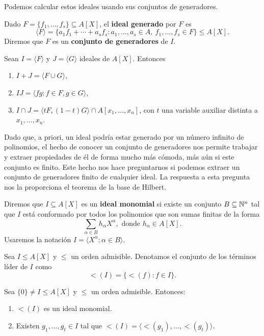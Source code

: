 Podemos calcular estos ideales usando sus conjuntos de generadores.
\begin{definicion}
    Dado $F=\{f_1,\dots, f_s\}\subseteq A[X]$, el \textbf{ideal generado} por $F$ es
    \begin{equation*}
        \langle F \rangle = \{a_1f_1 + \cdots + a_sf_s : a_1,\dots, a_s\in A,\ f_1,\dots, f_s\in F\}\le A[X].
    \end{equation*}
    Diremos que $F$ es un \textbf{conjunto de generadores} de $I$.
\end{definicion}

\begin{proposicion}
    Sean $I=\langle F\rangle$ y $J=\langle G\rangle$ ideales de $A[X]$. Entonces
    \begin{enumerate}
        \item $I+J = \langle F\cup G\rangle$,
        \item $IJ = \langle fg : f\in F, g\in G \rangle$,
        \item $I\cap J = \langle tF, (1-t)G \rangle \cap A[x_1,\dots, x_n]$, con $t$ una variable auxiliar distinta a $x_1,\dots, x_n$.
    \end{enumerate}
\end{proposicion}
Dado que, a priori, un ideal podría estar generado por un número infinito de polinomios, el hecho de conocer un conjunto de generadores nos permite trabajar y extraer propiedades de él de forma mucho más cómoda, más aún si este conjunto es finito. Este hecho nos hace preguntarnos si podemos extraer un conjunto de generadores finito de cualquier ideal. La respuesta a esta pregunta nos la proporciona el teorema de la base de Hilbert.
\begin{definicion}
    Diremos que $I\subseteq A[X]$ es un \textbf{ideal monomial} si existe un conjunto $B\subseteq \mathbb{N}^n$ tal que $I$ está conformado por todos los polinomios que son sumas finitas de la forma
    $$\sum_{\alpha \in B} h_{\alpha}X^{\alpha}, \text{ donde } h_{\alpha}\in A[X].$$
    Usaremos la notación $I = \langle X^{\alpha} : \alpha \in B \rangle$.
\end{definicion}
\begin{definicion}
    Sea $I\le A[X]$ y $\le$ un orden admisible. Denotamos el conjunto de los términos líder de $I$ como
    \begin{equation*}
        \lt(I) = \{\lt(f) : f\in I\}.
    \end{equation*}
\end{definicion}
\begin{lema}\label{l:lt}
    Sea $\{0\}\neq I\le A[X]$ y $\le$ un orden admisible. Entonces:
    \begin{enumerate}
        \item $ \lt(I)$ es un ideal monomial.
        \item Existen $g_1,\dots, g_t \in I$ tal que $\lt(I) = \langle \lt(g_1),\dots, \lt(g_t)\rangle$.
    \end{enumerate}
\end{lema}

